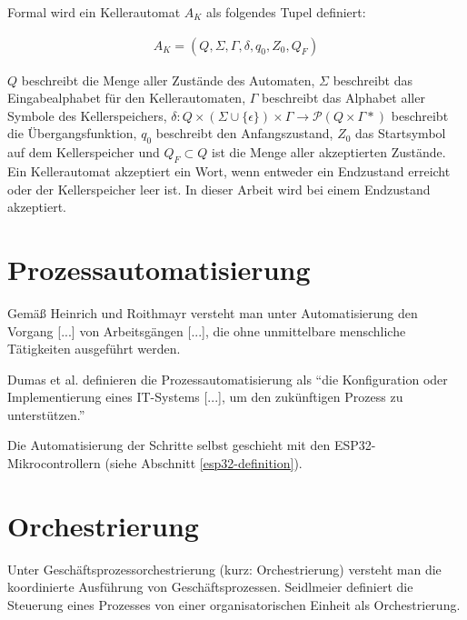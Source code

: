 \noindent Formal wird ein Kellerautomat $A_K$ als folgendes Tupel definiert:

\begin{align}
    A_K = (Q, \Sigma, \Gamma, \delta, q_0, Z_0, Q_F)
\end{align}

\noindent $Q$ beschreibt die Menge aller Zustände des Automaten, $\Sigma$ beschreibt das Eingabealphabet für den 
Kellerautomaten, $\Gamma$ beschreibt das Alphabet aller Symbole des Kellerspeichers, $\delta: Q \times (\Sigma \cup \{\epsilon\}) \times \Gamma \rightarrow \mathcal{P}(Q \times \Gamma*)$ beschreibt 
die Übergangsfunktion, $q_0$ beschreibt den Anfangszustand, $Z_0$ das Startsymbol auf dem Kellerspeicher und $Q_F \subset Q$ ist die Menge
aller akzeptierten Zustände. Ein Kellerautomat akzeptiert ein Wort, wenn entweder ein Endzustand erreicht oder der 
Kellerspeicher leer ist. In dieser Arbeit wird bei einem Endzustand akzeptiert. \cite{hopcroft_einfuhrung_nodate} 

\section{Prozessautomatisierung}
\label{process-automation-definition}

Gemäß Heinrich und Roithmayr versteht man unter Automatisierung
den Vorgang [...] von Arbeitsgängen [...], die ohne unmittelbare menschliche 
Tätigkeiten ausgeführt werden. \cite{heinrich_wirtschaftsinformatik-lexikon_1989}

\noindent Dumas et al. definieren die Prozessautomatisierung als ``die Konfiguration oder Implementierung eines \acs{IT}-Systems [...], um den zukünftigen Prozess
zu unterstützen.'' \cite{dumas_grundlagen_2021}

\noindent Die Automatisierung der Schritte selbst geschieht mit den ESP32-Mikrocontrollern (siehe Abschnitt \ref{esp32-definition}).

\section{Orchestrierung}
\label{orchestration-definition}

Unter Geschäftsprozessorchestrierung (kurz: Orchestrierung) versteht man die koordinierte Ausführung von Geschäftsprozessen. \cite{kampik_agent-based_2019}
Seidlmeier definiert die Steuerung eines Prozesses von einer organisatorischen Einheit als Orchestrierung. \cite{seidlmeier_prozessmodellierung_2019}

